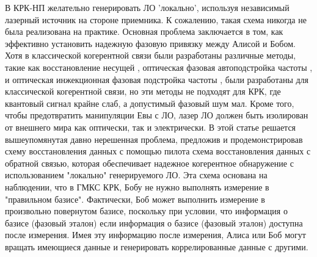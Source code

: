 В КРК-НП желательно генерировать ЛО 'локально', используя независимый лазерный источник на стороне приемника. К сожалению, такая схема никогда не была реализована на практике. Основная проблема заключается в том, как эффективно установить надежную фазовую привязку между Алисой и Бобом. Хотя в классической когерентной связи были разработаны различные методы, такие как восстановление несущей \cite{ip2007}, оптическая фазовая автоподстройка частоты \cite{ma2013}, и оптическая инжекционная фазовая подстройка частоты \cite{fice2011}, были разработаны для классической когерентной связи, но эти методы не подходят для КРК, где квантовый сигнал крайне слаб, а допустимый фазовый шум мал.
Кроме того, чтобы предотвратить манипуляции Евы с ЛО, лазер ЛО должен быть изолирован от внешнего мира как оптически, так и электрически.
В этой статье решается вышеупомянутая давно нерешенная проблема, предложив и продемонстрировав схему восстановления данных с помощью пилота схема восстановления данных с обратной связью, которая обеспечивает надежное когерентное обнаружение с использованием "локально" генерируемого ЛО.
Эта схема основана на наблюдении, что в ГМКС КРК, Бобу не нужно выполнять измерение в "правильном базисе". Фактически, Боб может выполнить измерение в произвольно повернутом базисе, поскольку при условии, что информация о базисе (фазовый эталон) если информация о базисе (фазовый эталон) доступна после измерения. Имея эту информацию  после измерения, Алиса или Боб могут вращать имеющиеся данные и генерировать коррелированные данные с другими. 
